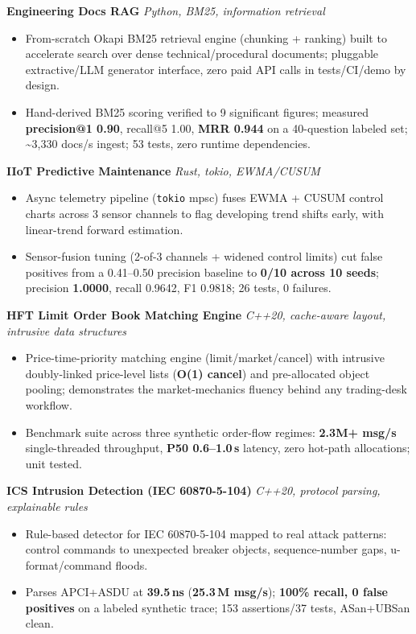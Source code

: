 \documentclass[10pt]{article}
\newcommand{\projectentry}[2]{%
  \noindent\textbf{#1} \hfill \textit{#2}\\[-0.3em]
}
\begin{document}
\projectentry{Engineering Docs RAG}{Python, BM25, information retrieval}
\begin{itemize}
  \item From-scratch Okapi BM25 retrieval engine (chunking + ranking) built to accelerate search over dense technical/procedural documents; pluggable extractive/LLM generator interface, zero paid API calls in tests/CI/demo by design.
  \item Hand-derived BM25 scoring verified to 9 significant figures; measured \textbf{precision@1 0.90}, recall@5 1.00, \textbf{MRR 0.944} on a 40-question labeled set; \textasciitilde3{,}330 docs/s ingest; 53 tests, zero runtime dependencies.
\end{itemize}

\projectentry{IIoT Predictive Maintenance}{Rust, tokio, EWMA/CUSUM}
\begin{itemize}
  \item Async telemetry pipeline (\texttt{tokio} mpsc) fuses EWMA + CUSUM control charts across 3 sensor channels to flag developing trend shifts early, with linear-trend forward estimation.
  \item Sensor-fusion tuning (2-of-3 channels + widened control limits) cut false positives from a 0.41--0.50 precision baseline to \textbf{0/10 across 10 seeds}; precision \textbf{1.0000}, recall 0.9642, F1 0.9818; 26 tests, 0 failures.
\end{itemize}

\projectentry{HFT Limit Order Book Matching Engine}{C++20, cache-aware layout, intrusive data structures}
\begin{itemize}
  \item Price-time-priority matching engine (limit/market/cancel) with intrusive doubly-linked price-level lists (\textbf{O(1) cancel}) and pre-allocated object pooling; demonstrates the market-mechanics fluency behind any trading-desk workflow.
  \item Benchmark suite across three synthetic order-flow regimes: \textbf{2.3M+ msg/s} single-threaded throughput, \textbf{P50 0.6--1.0\,\textmu s} latency, zero hot-path allocations; unit tested.
\end{itemize}

\projectentry{ICS Intrusion Detection (IEC 60870-5-104)}{C++20, protocol parsing, explainable rules}
\begin{itemize}
  \item Rule-based detector for IEC 60870-5-104 mapped to real attack patterns: control commands to unexpected breaker objects, sequence-number gaps, u-format/command floods.
  \item Parses APCI+ASDU at \textbf{39.5\,ns} (\textbf{25.3\,M msg/s}); \textbf{100\% recall, 0 false positives} on a labeled synthetic trace; 153 assertions/37 tests, ASan+UBSan clean.
\end{itemize}
\end{document}
